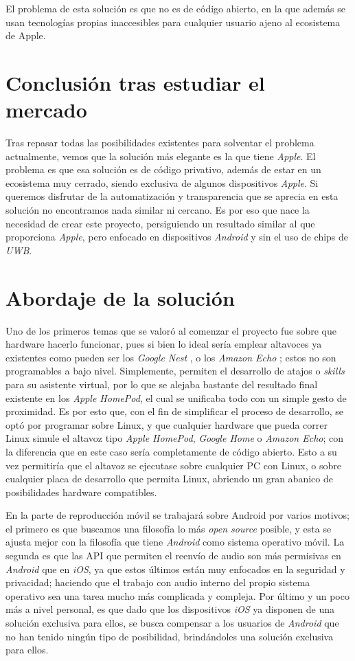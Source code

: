El problema de esta solución es que no es de código abierto, en la que además se usan
tecnologías propias inaccesibles para cualquier usuario ajeno al ecosistema de Apple.

\section{Conclusión tras estudiar el mercado}
Tras repasar todas las posibilidades existentes para solventar el problema
actualmente, vemos que la solución más elegante es la que tiene \emph{Apple}. El
problema es que esa solución es de código privativo, además de estar en un
ecosistema muy cerrado, siendo exclusiva de algunos dispositivos \emph{Apple}.
Si queremos disfrutar de la automatización y transparencia que se aprecia en
esta solución no encontramos nada similar ni cercano. Es por eso que nace la
necesidad de crear este proyecto, persiguiendo un resultado similar al que
proporciona \emph{Apple}, pero enfocado en dispositivos \emph{Android} y sin el
uso de chips de \emph{UWB}.\\

\section{Abordaje de la solución}

Uno de los primeros temas que se valoró al comenzar el proyecto fue sobre que
hardware hacerlo funcionar, pues si bien lo ideal sería emplear altavoces ya
existentes como pueden ser los \emph{Google Nest} \cite{google-nest}, o los
\emph{Amazon Echo} \cite{amazon-echo}; estos no son
programables a bajo nivel. Simplemente, permiten el desarrollo de atajos o
\emph{skills} para su asistente virtual, por lo que se alejaba bastante del
resultado final existente en los \emph{Apple HomePod}, el cual se unificaba todo
con un simple gesto de proximidad. Es por esto que, con el fin de simplificar el
proceso de desarrollo, se optó por programar sobre Linux, y que cualquier
hardware que pueda correr Linux simule el altavoz tipo \emph{Apple HomePod},
\emph{Google Home} o \emph{Amazon Echo}; con la diferencia que en este caso
sería completamente de código abierto. Esto a su vez permitiría que el altavoz
se ejecutase sobre cualquier PC con Linux, o sobre cualquier placa de desarrollo
que permita Linux, abriendo un gran abanico de posibilidades hardware
compatibles. 

En la parte de reproducción móvil se trabajará sobre Android por varios motivos;
el primero es que buscamos una filosofía lo más \emph{open source} posible, y
esta se ajusta mejor con la filosofía que tiene \emph{Android} como sistema
operativo móvil. La segunda es que las API que permiten el reenvío de audio son
más permisivas en \emph{Android} que en \emph{iOS}, ya que estos últimos están
muy enfocados en la seguridad y privacidad; haciendo que el trabajo con audio
interno del propio sistema operativo sea una tarea mucho más complicada y
compleja. Por último y un poco más a nivel personal, es que dado que los
dispositivos \emph{iOS} ya disponen de una solución exclusiva para ellos, se
busca compensar a los usuarios de \emph{Android} que no han tenido ningún tipo
de posibilidad, brindándoles una solución exclusiva para ellos.

